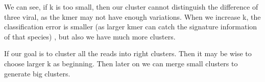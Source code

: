 \documentclass[11pt]{article}
\begin{document}
We can see, if k is too small, then our cluster cannot distinguish the difference of three viral, as the kmer may not have enough variations. When we increase k, the classification error is smaller (as larger kmer can catch the signature information of that species) , but also we have much more clusters.

If our goal is to cluster all the reads into right clusters. Then it may be wise to choose larger k as beginning. Then later on we can merge small clusters to generate big clusters.
\end{document}
